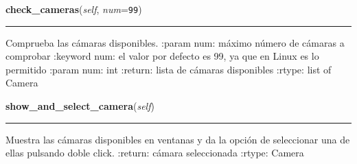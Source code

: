     \label{src:cameras:Cameras:check_cameras}

    \vspace{0.5ex}

\hspace{.8\funcindent}\begin{boxedminipage}{\funcwidth}

    \raggedright \textbf{check\_cameras}(\textit{self}, \textit{num}={\tt 99})

    \vspace{-1.5ex}

    \rule{\textwidth}{0.5\fboxrule}
\setlength{\parskip}{2ex}

Comprueba las cámaras disponibles.
:param num: máximo número de cámaras a comprobar
:keyword num: el valor por defecto es 99, ya que en Linux es lo
permitido
:param num: int
:return: lista de cámaras disponibles
:rtype: list of Camera
\setlength{\parskip}{1ex}
    \end{boxedminipage}

    \label{src:cameras:Cameras:show_and_select_camera}

    \vspace{0.5ex}

\hspace{.8\funcindent}\begin{boxedminipage}{\funcwidth}

    \raggedright \textbf{show\_and\_select\_camera}(\textit{self})

    \vspace{-1.5ex}

    \rule{\textwidth}{0.5\fboxrule}
\setlength{\parskip}{2ex}

Muestra las cámaras disponibles en ventanas y da la opción de
seleccionar una de ellas pulsando doble click.
:return: cámara seleccionada
:rtype: Camera
\setlength{\parskip}{1ex}
    \end{boxedminipage}

